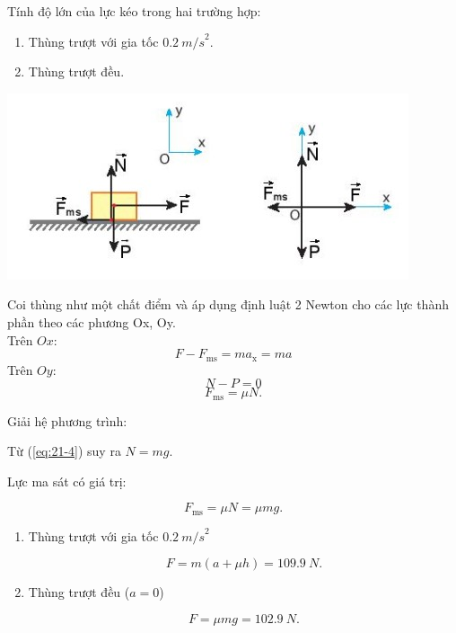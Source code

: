\begin{enumerate}[label=\bfseries Bài \arabic*:]
{	Tính độ lớn của lực kéo trong hai trường hợp:
	\begin{enumerate}[label=\alph*)]
		\item  Thùng trượt với gia tốc $\SI{0,2}{m/s}^2$.
		\item Thùng trượt đều.
	\end{enumerate}
}

\hideall
{
	\begin{center}
		\includegraphics[scale=1]{../figs/VN10-2022-PH-TP021-1.jpg}
	\end{center}
	
	Coi thùng như một chất điểm và áp dụng định luật 2 Newton cho các lực thành phần theo các phương Ox, Oy.\\
	Trên $Ox$:
	\begin{equation}
		\label{eq:21-3}
		F - F_\text{ms} = ma_\text{x} = ma
	\end{equation}
	Trên $Oy$:
	\begin{equation}
		\label{eq:21-4}
		N - P =0
	\end{equation}
	$$F_\text{ms} = \mu N.$$
	
	Giải hệ phương trình:
	
	Từ (\ref{eq:21-4}) suy ra $N = mg$.
	
	Lực ma sát có giá trị:
	
	$$F_\text{ms} = \mu N = \mu mg.$$
	
	\begin{enumerate}[label=\alph*)]
		\item  Thùng trượt với gia tốc $\SI{0,2}{m/s}^2$
		
		$$F = m(a + \mu h) = \SI{109,9}{N}.$$
		\item Thùng trượt đều ($a =0$)
		
		$$F = \mu mg = \SI{102,9}{N}.$$
		
	\end{enumerate}
	
	
}
\end{enumerate}
